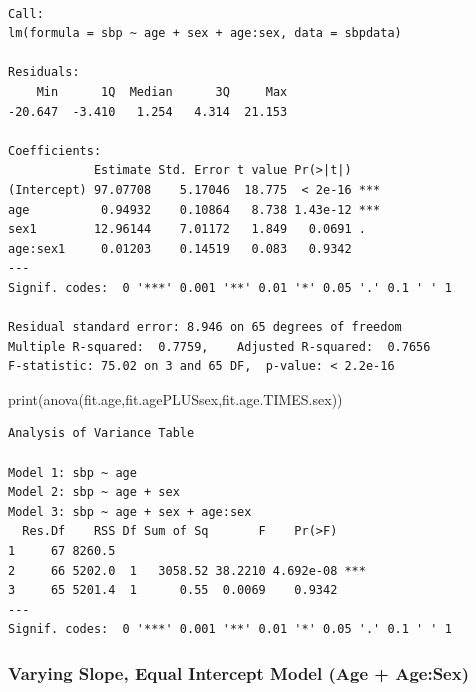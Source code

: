 \documentclass[
  letterpaper,
]{scrbook}
\newenvironment{Shaded}{\begin{snugshade}}{\end{snugshade}}
\newcommand{\FunctionTok}[1]{\textcolor[rgb]{0.28,0.35,0.67}{#1}}
\newcommand{\NormalTok}[1]{\textcolor[rgb]{0.00,0.23,0.31}{#1}}
\begin{document}
\begin{verbatim}

Call:
lm(formula = sbp ~ age + sex + age:sex, data = sbpdata)

Residuals:
    Min      1Q  Median      3Q     Max 
-20.647  -3.410   1.254   4.314  21.153 

Coefficients:
            Estimate Std. Error t value Pr(>|t|)    
(Intercept) 97.07708    5.17046  18.775  < 2e-16 ***
age          0.94932    0.10864   8.738 1.43e-12 ***
sex1        12.96144    7.01172   1.849   0.0691 .  
age:sex1     0.01203    0.14519   0.083   0.9342    
---
Signif. codes:  0 '***' 0.001 '**' 0.01 '*' 0.05 '.' 0.1 ' ' 1

Residual standard error: 8.946 on 65 degrees of freedom
Multiple R-squared:  0.7759,    Adjusted R-squared:  0.7656 
F-statistic: 75.02 on 3 and 65 DF,  p-value: < 2.2e-16
\end{verbatim}

\begin{Shaded}
\begin{Highlighting}[]
\FunctionTok{print}\NormalTok{(}\FunctionTok{anova}\NormalTok{(fit.age,fit.agePLUSsex,fit.age.TIMES.sex))}
\end{Highlighting}
\end{Shaded}

\begin{verbatim}
Analysis of Variance Table

Model 1: sbp ~ age
Model 2: sbp ~ age + sex
Model 3: sbp ~ age + sex + age:sex
  Res.Df    RSS Df Sum of Sq       F    Pr(>F)    
1     67 8260.5                                   
2     66 5202.0  1   3058.52 38.2210 4.692e-08 ***
3     65 5201.4  1      0.55  0.0069    0.9342    
---
Signif. codes:  0 '***' 0.001 '**' 0.01 '*' 0.05 '.' 0.1 ' ' 1
\end{verbatim}

\subsubsection{Varying Slope, Equal Intercept Model (Age +
Age:Sex)}\label{varying-slope-equal-intercept-model-age-agesex}
\end{document}
